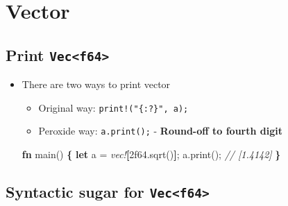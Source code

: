 \documentclass[]{book}
\newenvironment{Shaded}{\begin{snugshade}}{\end{snugshade}}
\newcommand{\CommentTok}[1]{\textcolor[rgb]{0.56,0.35,0.01}{\textit{#1}}}
\newcommand{\DecValTok}[1]{\textcolor[rgb]{0.00,0.00,0.81}{#1}}
\newcommand{\KeywordTok}[1]{\textcolor[rgb]{0.13,0.29,0.53}{\textbf{#1}}}
\newcommand{\NormalTok}[1]{#1}
\newcommand{\OperatorTok}[1]{\textcolor[rgb]{0.81,0.36,0.00}{\textbf{#1}}}
\newcommand{\PreprocessorTok}[1]{\textcolor[rgb]{0.56,0.35,0.01}{\textit{#1}}}
\providecommand{\tightlist}{%
  \setlength{\itemsep}{0pt}\setlength{\parskip}{0pt}}
\begin{document}
\hypertarget{vector}{%
\chapter{Vector}\label{vector}}

\hypertarget{print-vecf64}{%
\section{\texorpdfstring{Print \texttt{Vec\textless{}f64\textgreater{}}}{Print Vec\textless{}f64\textgreater{}}}\label{print-vecf64}}

\begin{itemize}
\tightlist
\item
  There are two ways to print vector

  \begin{itemize}
  \tightlist
  \item
    Original way: \texttt{print!("\{:?\}",\ a);}
  \item
    Peroxide way: \texttt{a.print();} - \textbf{Round-off to fourth digit}
  \end{itemize}

\begin{Shaded}
\begin{Highlighting}[]
\KeywordTok{fn}\NormalTok{ main() }\OperatorTok{\{}
    \KeywordTok{let}\NormalTok{ a = }\PreprocessorTok{vec!}\OperatorTok{[}\DecValTok{2f64}\NormalTok{.sqrt()}\OperatorTok{]}\NormalTok{;}
\NormalTok{    a.print(); }\CommentTok{// [1.4142]}
\OperatorTok{\}}
\end{Highlighting}
\end{Shaded}
\end{itemize}

\hypertarget{syntactic-sugar-for-vecf64}{%
\section{\texorpdfstring{Syntactic sugar for \texttt{Vec\textless{}f64\textgreater{}}}{Syntactic sugar for Vec\textless{}f64\textgreater{}}}\label{syntactic-sugar-for-vecf64}}
\end{document}
